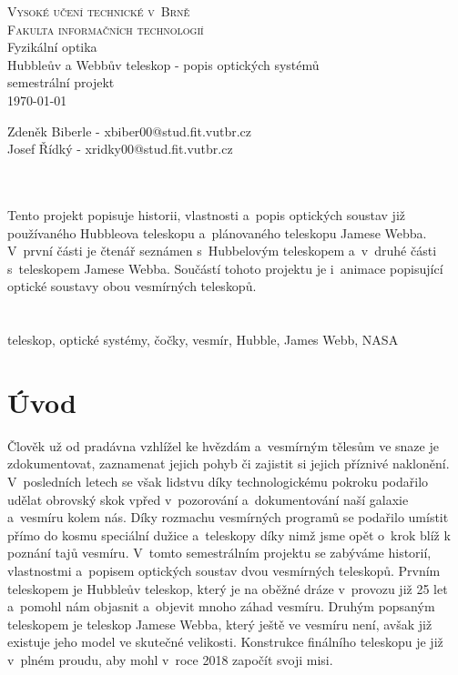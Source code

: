 \documentclass[a4paper,11pt]{article}
\begin{document}
\begin{titlepage}
\begin{center}
\Huge
\textsc{Vysoké učení technické v~Brně\\ \huge Fakulta informačních technologií}\\
\Huge Fyzikální optika \\ 
\LARGE Hubbleův a Webbův teleskop - popis optických systémů  \\
semestrální projekt \\
\today
{}
\end{center}
\Large Zdeněk Biberle - xbiber00@stud.fit.vutbr.cz \\ Josef Řídký - xridky00@stud.fit.vutbr.cz
\end{titlepage}
\newpage

\tableofcontents

\newpage

\Large{}\\
\normalsize\noindent\\ Tento projekt popisuje historii, vlastnosti a~popis optických soustav již používaného Hubbleova teleskopu a~plánovaného teleskopu Jamese Webba. V~první části je čtenář seznámen s~Hubbelovým teleskopem a~v~druhé části s~teleskopem Jamese Webba. Součástí tohoto projektu je i~animace popisující optické soustavy obou vesmírných teleskopů.\\
\\
\Large{}\\
\normalsize\noindent teleskop, optické systémy, čočky, vesmír, Hubble, James Webb, NASA\\
\newpage


\section{Úvod}
Člověk už od pradávna vzhlížel ke hvězdám a~vesmírným tělesům ve snaze je zdokumentovat, zaznamenat jejich pohyb či zajistit si jejich příznivé naklonění. V~posledních letech se však lidstvu díky technologickému pokroku podařilo udělat obrovský skok vpřed v~pozorování a~dokumentování naší galaxie a~vesmíru kolem nás. Díky rozmachu vesmírných programů se podařilo umístit přímo do kosmu speciální dužice a~teleskopy díky nimž jsme opět o~krok blíž k poznání tajů vesmíru. V~tomto semestrálním projektu se zabýváme historií, vlastnostmi a~popisem optických soustav dvou vesmírných teleskopů. Prvním teleskopem je Hubbleův teleskop, který je na oběžné dráze v~provozu již 25 let a~pomohl nám objasnit a~objevit mnoho záhad vesmíru. Druhým popsaným teleskopem je teleskop Jamese Webba, který ještě ve vesmíru není, avšak již existuje jeho model ve skutečné velikosti. Konstrukce finálního teleskopu je již v~plném proudu, aby mohl v~roce 2018 započít svoji misi. 
\end{document}
